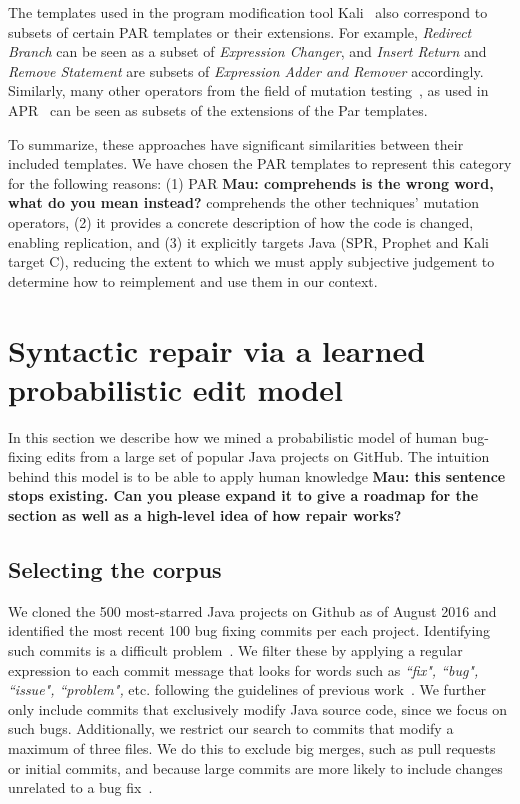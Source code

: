 \documentclass[conference]{IEEEtran}
\newcommand{\todo}[1]
  {{\scriptsize \textbf{\color{red} {#1}}}}
\begin{document}
The templates used in the program modification tool Kali~\cite{Qi15}
also correspond to subsets of certain PAR templates or their extensions. 
For example, \emph{Redirect Branch} can be seen as
a subset of \emph{Expression Changer}, and \emph{Insert Return} and \emph{Remove Statement} are
subsets of \emph{Expression Adder and Remover} accordingly. Similarly,
many other operators from the field of mutation testing~\cite{Offutt06}, as used in
APR~\cite{debroy10,xuan16} can be seen as subsets of the extensions of the 
Par templates.  

To summarize, these approaches have significant similarities between their
included templates.  We have chosen the PAR templates to represent this category
for the following reasons: (1) PAR \todo{Mau: comprehends is the wrong word, what do you mean
  instead?} comprehends the other techniques' mutation operators, (2) it
provides a concrete description of how the code is changed, enabling
replication, and (3) it explicitly targets Java (SPR, Prophet and Kali
target C), reducing the extent to which we must apply subjective judgement to
determine how to reimplement and use them in our context.

\section{Syntactic repair via a learned probabilistic edit model} \label{buildingTheModel}

In this section we describe how we mined a probabilistic
model of human bug-fixing edits from a large set of popular Java projects on
GitHub. The intuition behind this model is to be able to apply human
knowledge\todo{Mau: this sentence stops existing. Can you please expand it to
  give a roadmap for the section as well as a high-level idea of how repair works?}

\subsection{Selecting the corpus}

We cloned the 500 most-starred Java projects on Github 
as of August 2016 and
identified the most recent 100 bug fixing commits per each project. Identifying
such commits is a difficult
problem~\cite{Bird09}. We filter these by applying a
regular expression to each commit message that looks for words such as \emph{``fix", ``bug", ``issue", ``problem",}
etc. following the guidelines of previous work~\cite{schroter06}.
%
We further only include commits
that exclusively 
modify Java source code, since we focus on such bugs. Additionally, we restrict our search to commits 
that modify a maximum of three files. We do this to exclude
big merges, such as pull requests or initial commits, and because
large commits are more likely to include changes unrelated to a bug fix~\cite{Herzig13,Kawrykow11}.
\end{document}
